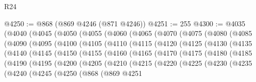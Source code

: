 \begin{lexlean}{R24}
\begin{coremodule}
@4250 := @868 (@869 @4246 (@871 @4246))
@4251 := 255
@4300 := @4035
    (@4040
      (@4045
        (@4050
          (@4055
            (@4060
              (@4065
                (@4070
                  (@4075
                    (@4080
                      (@4085
                        (@4090
                          (@4095
                            (@4100
                              (@4105
                                (@4110
                                  (@4115
                                    (@4120
                                      (@4125
                                        (@4130
                                          (@4135
                                            (@4140
                                              (@4145
                                                (@4150
                                                  (@4155
                                                    (@4160
                                                      (@4165
                                                        (@4170
                                                          (@4175
                                                            (@4180
                                                              (@4185
                                                                (@4190
                                                                  (@4195
                                                                    (@4200
                                                                      (@4205
                                                                        (@4210
                                                                          (@4215
                                                                            (@4220
                                                                              (@4225
                                                                                (@4230
                                                                                  (@4235
                                                                                    (@4240
                                                                                      (@4245
                                                                                        (@4250
                                                                                          (@868
                                                                                            (@869
                                                                                              @4251

\end{coremodule}
\end{lexlean}
